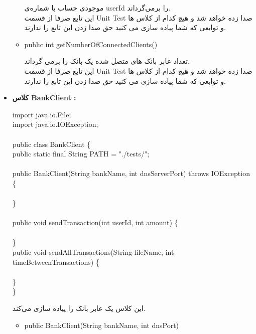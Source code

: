 \documentclass[]{article}
\newcommand\tab[1][1cm]{\hspace*{#1}}
\begin{document}
\begin{itemize}
\begin{itemize}[label = {}]
موجودی حساب با شماره‌ی userId را برمی‌گرداند.\\
این تابع صرفا از قسمت Unit Test صدا زده خواهد شد و هیچ کدام از کلاس ها و توابعی که شما پیاده سازی می کنید حق صدا زدن این تابع را ندارند.

\item	
\begin{tcolorbox}[boxrule=0pt]
	\begin{latin}
  	  \large{
  	  	public int getNumberOfConnectedClients()
		}
	\end{latin}
\end{tcolorbox}

تعداد عابر بانک های متصل شده یک بانک را برمی گرداند.\\
این تابع صرفا از قسمت Unit Test صدا زده خواهد شد و هیچ کدام از کلاس ها و توابعی که شما پیاده سازی می کنید حق صدا زدن این تابع را ندارند.
\end{itemize}

\item \textbf{کلاس BankClient :}\\
\begin{tcolorbox}[boxrule=0pt]
	\begin{latin}
  	  \large{
import java.io.File;\\
import java.io.IOException;\\
\\
public class BankClient \{\\
\tab    public static final String PATH = "./tests/";\\
\\
\tab    public BankClient(String bankName, int dnsServerPort) throws IOException \{\\
\\
\tab    \}\\
\\
\tab    public void sendTransaction(int userId, int amount) \{\\
\\
\tab    \}\\

\tab    public void sendAllTransactions(String fileName, int timeBetweenTransactions) \{\\
\\
\tab    \}\\
\}
		}
	\end{latin}
\end{tcolorbox}
این کلاس یک عابر بانک را پیاده‌ سازی می‌کند.
\begin{itemize}[label = {}]
\item	
\begin{tcolorbox}[boxrule=0pt]
	\begin{latin}
  	  \large{
  	  	public BankClient(String bankName, int dnsPort)
		}
	\end{latin}
\end{tcolorbox}


\end{itemize}
\end{itemize}
\end{document}
